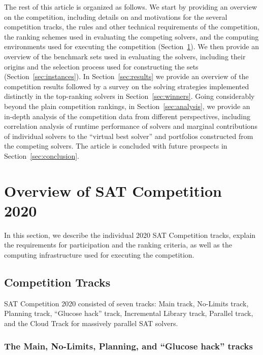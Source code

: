 \documentclass{elsarticle}
\begin{document}
The rest of this article is organized as follows. 
We start by providing an overview on the competition, including details on and motivations for the several
competition tracks, the rules and other technical requirements of the competition, the ranking schemes used
in evaluating the competing solvers, 
and the computing environments used for executing the competition
(Section~\ref{sec:overview}).
We then provide an overview of the benchmark sets used in evaluating the solvers, including their origins and the selection
process used for constructing the sets (Section~\ref{sec:instances}).
In Section~\ref{sec:results} we provide an overview of the competition results %
followed by a survey on 
the solving strategies implemented distinctly in the top-ranking solvers in Section~\ref{sec:winners}. 
Going considerably beyond the plain competition rankings, in Section~\ref{sec:analysis}, we provide an in-depth analysis of the competition 
data from different perspectives, including correlation analysis of runtime performance of solvers and marginal contributions
of individual solvers to the ``virtual best solver'' and 
portfolios constructed from the competing solvers.
The article is concluded with future prospects in Section~\ref{sec:conclusion}.


\section{Overview of SAT Competition 2020}
\label{sec:overview}

In this section, we describe the individual 2020 SAT Competition tracks,
explain the requirements for participation %
and the ranking criteria, as well as
the computing infrastructure used for executing the competition.

\subsection{Competition Tracks}

SAT Competition 2020 consisted of seven tracks:
Main track, No-Limits track, Planning track, ``Glucose hack'' track,
Incremental Library track, Parallel track,
and the Cloud Track for massively parallel SAT solvers. %

\subsubsection{The Main, No-Limits, Planning, and ``Glucose hack'' tracks}
\end{document}
